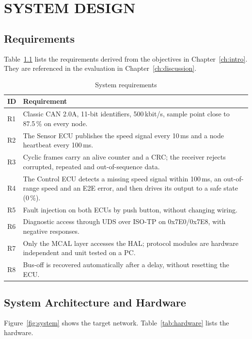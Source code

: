 \chapter{SYSTEM DESIGN}
\label{ch:design}

\section{Requirements}

Table~\ref{tab:requirements} lists the requirements derived from the objectives in Chapter~\ref{ch:intro}. They are referenced in the evaluation in Chapter~\ref{ch:discussion}.

\begin{table}[H]
\centering
\small
\caption{System requirements}
\label{tab:requirements}
\begin{tabularx}{\textwidth}{@{}lX@{}}
\toprule
\textbf{ID} & \textbf{Requirement} \\
\midrule
R1 & Classic CAN 2.0A, 11-bit identifiers, 500\,kbit/s, sample point close to 87.5\,\% on every node. \\
R2 & The Sensor ECU publishes the speed signal every 10\,ms and a node heartbeat every 100\,ms. \\
R3 & Cyclic frames carry an alive counter and a CRC; the receiver rejects corrupted, repeated and out-of-sequence data. \\
R4 & The Control ECU detects a missing speed signal within 100\,ms, an out-of-range speed and an E2E error, and then drives its output to a safe state (0\,\%). \\
R5 & Fault injection on both ECUs by push button, without changing wiring. \\
R6 & Diagnostic access through UDS over ISO-TP on 0x7E0/0x7E8, with negative responses. \\
R7 & Only the MCAL layer accesses the HAL; protocol modules are hardware independent and unit tested on a PC. \\
R8 & Bus-off is recovered automatically after a delay, without resetting the ECU. \\
\bottomrule
\end{tabularx}
\end{table}

\section{System Architecture and Hardware}

Figure~\ref{fig:system} shows the target network. Table~\ref{tab:hardware} lists the hardware.

